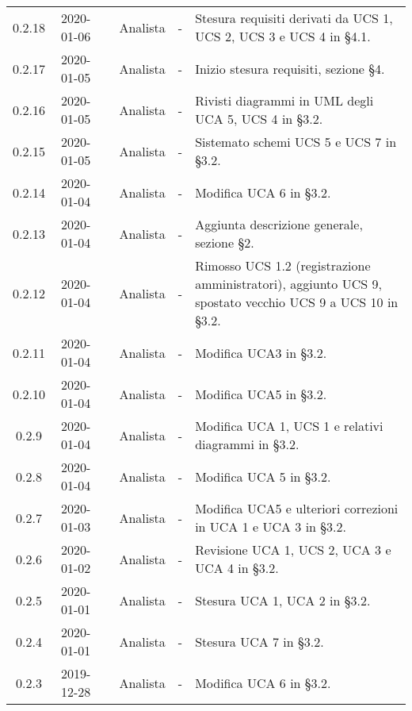 {\begin{longtable}{ c c  C{2.3cm} c C{3cm} C{3.2cm}}
0.2.18 & 2020-01-06 & \CE{} & Analista & - & Stesura requisiti derivati da UCS 1, UCS 2, UCS 3 e UCS 4 in §4.1. \\

0.2.17 & 2020-01-05 & \CE{} & Analista & - & Inizio stesura requisiti, sezione §4. \\

0.2.16 & 2020-01-05 & \DF{} & Analista & - & Rivisti diagrammi in UML degli UCA 5, UCS 4 in §3.2. \\

0.2.15 & 2020-01-05 & \PF{} & Analista & - & Sistemato schemi UCS 5 e UCS 7 in §3.2. \\

0.2.14 & 2020-01-04 & \PF{} & Analista & - & Modifica UCA 6 in §3.2. \\

0.2.13 & 2020-01-04 & \CE{} & Analista & - & Aggiunta descrizione generale, sezione §2. \\

0.2.12 & 2020-01-04 & \CE{} & Analista & - & Rimosso UCS 1.2 (registrazione amministratori), aggiunto UCS 9, spostato vecchio UCS 9 a UCS 10 in §3.2. \\

0.2.11 & 2020-01-04 & \PF{} & Analista & - & Modifica UCA3 in §3.2. \\

0.2.10 & 2020-01-04 & \DF{} & Analista & - & Modifica UCA5 in §3.2. \\

0.2.9 & 2020-01-04 & \DF{} & Analista & - & Modifica UCA 1, UCS 1 e relativi diagrammi in §3.2. \\

0.2.8 & 2020-01-04 & \CE{} & Analista & - & Modifica UCA 5 in §3.2. \\

0.2.7 & 2020-01-03 & \CE{} & Analista & - & Modifica UCA5 e ulteriori correzioni in UCA 1 e UCA 3 in §3.2. \\

0.2.6 & 2020-01-02 & \CE{} & Analista & - & Revisione UCA 1, UCS 2, UCA 3 e UCA 4 in §3.2. \\

0.2.5 & 2020-01-01 & \BR{} & Analista & - & Stesura UCA 1, UCA 2 in §3.2. \\

0.2.4 & 2020-01-01 & \PF{} & Analista & - & Stesura UCA 7 in §3.2. \\

0.2.3 & 2019-12-28 & \DF{} & Analista & - & Modifica UCA 6 in §3.2. \\


\end{longtable}}
